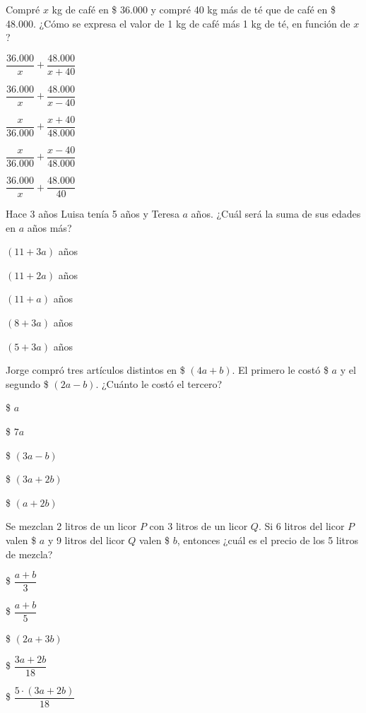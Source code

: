 \documentclass{sn-guia}
\begin{document}
\begin{problemas}
    \problema Compré $x$ kg de café en \$ 36.000 y compré 40 kg más de té que de 
    café en \$ 48.000. ¿Cómo se expresa el valor de 1 kg de café más 1 kg de té, 
    en función de $x$?
    \begin{alternativas}[]
        \item $\dfrac{36.000}{x}+\dfrac{48.000}{x+40}$
        \item $\dfrac{36.000}{x}+\dfrac{48.000}{x-40}$
        \item $\dfrac{x}{36.000}+\dfrac{x+40}{48.000}$
        \item $\dfrac{x}{36.000}+\dfrac{x-40}{48.000}$
        \item $\dfrac{36.000}{x}+\dfrac{48.000}{40}$
    \end{alternativas}
    \problema Hace 3 años Luisa tenía 5 años y Teresa $a$ años. ¿Cuál será la 
    suma de sus edades en $a$ años más?
    \begin{alternativas}[]
        \item $(11+3a)$ años
        \item $(11+2a)$ años
        \item $(11+a)$ años
        \item $(8+3a)$ años
        \item $(5+3a)$ años
    \end{alternativas}
    \problema Jorge compró tres artículos distintos en \$ $(4a+b)$. El primero 
    le costó \$ $a$ y el segundo \$ $(2a-b)$. ¿Cuánto le costó el tercero?
    \begin{alternativas}[]
        \item \$ $a$
        \item \$ $7a$
        \item \$ $(3a-b)$
        \item \$ $(3a+2b)$
        \item \$ $(a+2b)$
    \end{alternativas}
    \problema Se mezclan 2 litros de un licor $P$ con 3 litros de un licor $Q$. Si 6 
    litros del licor $P$ valen \$ $a$ y 9 litros del licor $Q$ valen \$ $b$, entonces 
    ¿cuál es el precio de los 5 litros de mezcla?
    \begin{alternativas}[]
        \item \$ $\dfrac{a+b}{3}$
        \item \$ $\dfrac{a+b}{5}$
        \item \$ $(2a+3b)$
        \item \$ $\dfrac{3a+2b}{18}$
        \item \$ $\dfrac{5\cdot(3a+2b)}{18}$

\end{alternativas}
\end{problemas}
\end{document}
